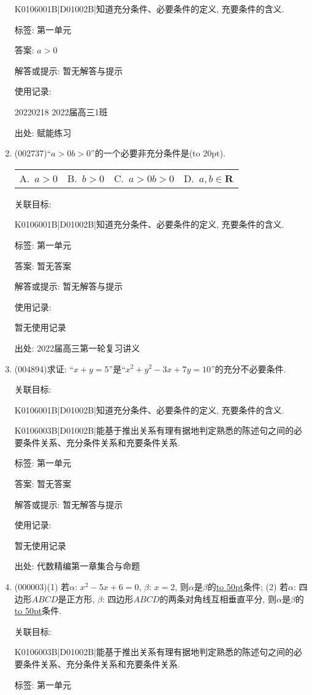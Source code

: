 \documentclass[10pt,a4paper]{article}
\newcommand{\blank}[1]{\underline{\hbox to #1pt{}}}
\newcommand{\bracket}[1]{(\hbox to #1pt{})}
\newcommand{\fourch}[4]{\par\begin{tabular}{p{.23\textwidth}p{.23\textwidth}p{.23\textwidth}p{.23\textwidth}}
A.~#1 &B.~#2& C.~#3& D.~#4
\end{tabular}}
\begin{document}
\begin{enumerate}[1.]
K0106001B|D01002B|知道充分条件、必要条件的定义, 充要条件的含义.



标签: 第一单元

答案: $a>0$

解答或提示: 暂无解答与提示

使用记录:

20220218	2022届高三1班	


出处: 赋能练习
\item { (002737)}``$a>0b>0$''的一个必要非充分条件是\bracket{20}.
\fourch{$a>0$}{$b>0$}{$a>0b>0$}{$a,b\in \mathbf{R}$}


关联目标:

K0106001B|D01002B|知道充分条件、必要条件的定义, 充要条件的含义.



标签: 第一单元

答案: 暂无答案

解答或提示: 暂无解答与提示

使用记录:

暂无使用记录


出处: 2022届高三第一轮复习讲义
\item { (004894)}求证: ``$x+y=5$''是``$x^2+y^2-3x+7y=10$''的充分不必要条件.


关联目标:

K0106001B|D01002B|知道充分条件、必要条件的定义, 充要条件的含义.

K0106003B|D01002B|能基于推出关系有理有据地判定熟悉的陈述句之间的必要条件关系、充分条件关系和充要条件关系.



标签: 第一单元

答案: 暂无答案

解答或提示: 暂无解答与提示

使用记录:

暂无使用记录


出处: 代数精编第一章集合与命题
\item { (000003)}(1) 若$\alpha$: $x^2-5x+6=0$, $\beta$: $x=2$, 则$\alpha$是$\beta$的\blank{50}条件;
(2) 若$\alpha$: 四边形$ABCD$是正方形, $\beta$: 四边形$ABCD$的两条对角线互相垂直平分, 则$\alpha$是$\beta$的\blank{50}条件.


关联目标:

K0106003B|D01002B|能基于推出关系有理有据地判定熟悉的陈述句之间的必要条件关系、充分条件关系和充要条件关系.



标签: 第一单元


\end{enumerate}
\end{document}

